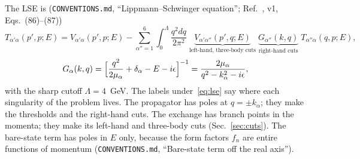 \documentclass[11pt]{article}
\newcommand{\file}[1]{\nolinkurl{#1}}
\begin{document}
The LSE is (\file{CONVENTIONS.md}, ``Lippmann--Schwinger equation''; Ref.~\cite{Zhang:2026iyr}, v1, Eqs.~(86)--(87))
\begin{equation}\label{eq:lse}
T_{\alpha'\alpha}(p',p;E)=V_{\alpha'\alpha}(p',p;E)-\sum_{\alpha''=1}^{6}\int_0^\Lambda\frac{q^2dq}{2\pi^2}\;
\underbrace{V_{\alpha'\alpha''}(p',q;E)}_{\text{left-hand, three-body cuts}}\;
\underbrace{G_{\alpha''}(k,q)}_{\text{right-hand cuts}}\;
T_{\alpha''\alpha}(q,p;E),
\end{equation}
\begin{equation}\label{eq:G}
G_\alpha(k,q)=\Bigl[\frac{q^2}{2\mu_\alpha}+\delta_\alpha-E-i\epsilon\Bigr]^{-1}=\frac{2\mu_\alpha}{q^2-k_\alpha^2-i\epsilon},
\end{equation}
with the sharp cutoff $\Lambda=4$~GeV. The labels under~\eqref{eq:lse} say where each singularity of the problem lives. The propagator has poles at $q=\pm k_\alpha$; they make the thresholds and the right-hand cuts. The exchange has branch points in the momenta; they make its left-hand and three-body cuts (Sec.~\ref{sec:cuts}). The bare-state term has poles in $E$ only, because the form factors $f_n$ are entire functions of momentum (\file{CONVENTIONS.md}, ``Bare-state term off the real axis'').
\end{document}
